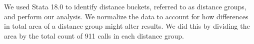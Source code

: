 \documentclass[12pt]{article}
\begin{document}
We used Stata 18.0 to identify distance buckets, referred to as distance groups, and perform our analysis. We normalize the data to account for how differences in total area of a distance group might alter results. We did this by dividing the area by the total count of 911 calls in each distance group. 


\end{document}

